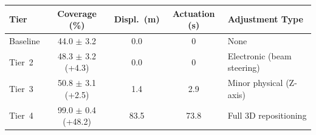 \begin{tabular}{@{} l c c c l @{}}
\toprule
\textbf{Tier} & \textbf{Coverage (\%)} & \textbf{Displ.\ (m)} & \textbf{Actuation (s)} & \textbf{Adjustment Type} \\
\midrule
Baseline & 44.0 $\pm$ 3.2 & 0.0 & 0 & None \\
Tier~2 & 48.3 $\pm$ 3.2 (+4.3) & 0.0 & 0 & Electronic (beam steering) \\
Tier~3 & 50.8 $\pm$ 3.1 (+2.5) & 1.4 & 2.9 & Minor physical (Z-axis) \\
Tier~4 & 99.0 $\pm$ 0.4 (+48.2) & 83.5 & 73.8 & Full 3D repositioning \\
\bottomrule
\end{tabular}
